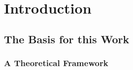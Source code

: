 
\chapter{Introduction}
\label{cha:intro}

\section{The Basis for this Work}
\label{sec:basis}

\subsection{A Theoretical Framework}
\label{sec:framework}

